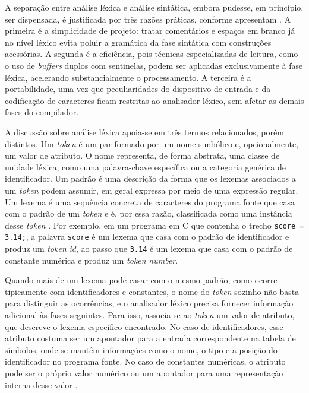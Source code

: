\documentclass[
    12pt
    ,oneside
    ,a4paper
    ,chapter=TITLE
    ,section=TITLE
    ,sumario=abnt-6027-2012]{abntex2}
\begin{document}
A separação entre análise léxica e análise sintática, embora pudesse, em princípio, ser dispensada,
é justificada por três razões práticas, conforme apresentam . A primeira
é a simplicidade de projeto: tratar comentários e espaços em branco já no nível léxico evita
poluir a gramática da fase sintática com construções acessórias. A segunda é a eficiência, pois
técnicas especializadas de leitura, como o uso de \textit{buffers} duplos com sentinelas, podem
ser aplicadas exclusivamente à fase léxica, acelerando substancialmente o processamento. A
terceira é a portabilidade, uma vez que peculiaridades do dispositivo de entrada e da
codificação de caracteres ficam restritas ao analisador léxico, sem afetar as demais fases do
compilador.

A discussão sobre análise léxica apoia-se em três termos relacionados, porém distintos. Um
\textit{token} é um par formado por um nome simbólico e, opcionalmente, um valor de atributo.
O nome representa, de forma abstrata, uma classe de unidade léxica, como uma palavra-chave
específica ou a categoria genérica de identificador. Um padrão é uma descrição da forma
que os lexemas associados a um \textit{token} podem assumir, em geral expressa por meio de uma
expressão regular. Um lexema é uma sequência concreta de caracteres do programa fonte
que casa com o padrão de um \textit{token} e é, por essa razão, classificada como uma instância
desse \textit{token} \cite{aho2008}. Por exemplo, em um programa em C que contenha o trecho
\texttt{score = 3.14;}, a palavra \texttt{score} é um lexema que casa com o padrão de
identificador e produz um \textit{token} \textit{id}, ao passo que \texttt{3.14} é um lexema que
casa com o padrão de constante numérica e produz um \textit{token} \textit{number}.

Quando mais de um lexema pode casar com o mesmo padrão, como ocorre tipicamente com
identificadores e constantes, o nome do \textit{token} sozinho não basta para distinguir as
ocorrências, e o analisador léxico precisa fornecer informação adicional às fases seguintes. Para
isso, associa-se ao \textit{token} um valor de atributo, que descreve o lexema
específico encontrado. No caso de identificadores, esse atributo costuma ser um apontador para
a entrada correspondente na tabela de símbolos, onde se mantêm informações como o nome, o tipo
e a posição do identificador no programa fonte. No caso de constantes numéricas, o atributo
pode ser o próprio valor numérico ou um apontador para uma representação interna desse valor
\cite{aho2008}.
\end{document}
